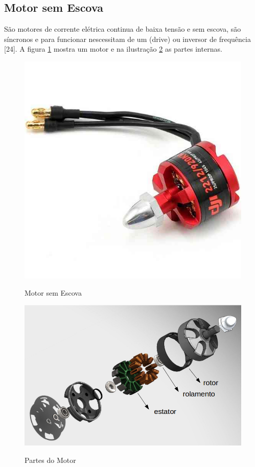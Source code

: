 \subsection{Motor sem Escova}
São motores de corrente elétrica continua de baixa tensão e sem escova, são síncronos e para funcionar nescessitam de um (drive) ou inversor de frequência [24]. A figura \ref{fig:motor} mostra um motor e na ilustração \ref{fig:motorpart} as partes internas.
\begin{figure}[H]
  \centering
  \caption{Motor sem Escova}
  \includegraphics[scale=.3]{figs/brushless motor.jpg}
  \label{fig:motor}
\end{figure}

\begin{figure}[H]
  \centering
  \caption{Partes do Motor}
  \includegraphics[scale=.4]{figs/motorexp.png}
  \label{fig:motorpart}
\end{figure}
